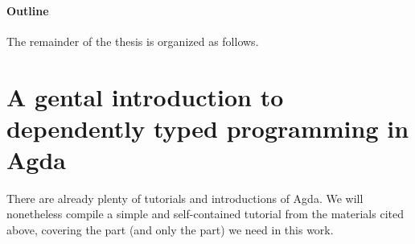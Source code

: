 \documentclass[12pt, a4paper]{article}
\begin{document}


%

%

\paragraph{Outline}
The remainder of the thesis is organized as follows.

\section{A gental introduction to dependently typed programming in Agda}\label{agda}

There are already plenty of tutorials and introductions of Agda\cite{norell2009dependently}\cite{FLOLAC16DTP}\cite{brutal}.
We will nonetheless compile a simple and self-contained tutorial from the
materials cited above, covering the part (and only the part) we need in this work.
\end{document}
